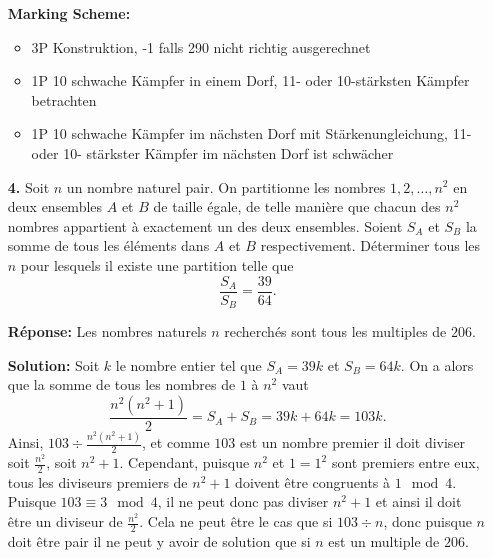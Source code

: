 \documentclass[language=german,style=solution]{smo}
\begin{document}
\begin{enumerate}
\textbf{Marking Scheme:}
\begin{itemize}
	\item 3P Konstruktion, -1 falls 290 nicht richtig ausgerechnet
	\item 1P 10 schwache Kämpfer in einem Dorf, 11- oder 10-stärksten Kämpfer betrachten
	\item 1P 10 schwache Kämpfer im nächsten Dorf mit Stärkenungleichung, 11- oder 10- stärkster Kämpfer im nächsten Dorf ist schwächer
\end{itemize}


\newpage

\item[\textbf{4.}] %
Soit $n$ un nombre naturel pair. On partitionne les nombres $1, 2, \ldots, n^2$ en deux ensembles $A$ et $B$ de taille égale, de telle manière que chacun des $n^2$ nombres appartient à exactement un des deux ensembles. Soient $S_A$ et $S_B$ la somme de tous les éléments dans $A$ et $B$ respectivement. Déterminer tous les $n$ pour lesquels il existe une partition telle que
\[
\frac{S_A}{S_B} = \frac{39}{64}.
\]

\textbf{Réponse:}
Les nombres naturels $n$ recherchés sont tous les multiples de $206$.

\textbf{Solution:}
Soit $k$ le nombre entier tel que $S_A = 39k$ et $S_B = 64k$. On a alors que la somme de tous les nombres de $1$ à $n^2$ vaut
\[
	\frac{n^2(n^2+1)}{2} = S_A + S_B = 39k + 64k = 103k.
\]
Ainsi, $103 \div \frac{n^2(n^2+1)}{2}$, et comme $103$ est un nombre premier il doit diviser soit $\frac{n^2}{2}$, soit $n^2+1$. Cependant, puisque $n^2$ et $1 = 1^2$ sont premiers entre eux, tous les diviseurs premiers de $n^2+1$ doivent être congruents à $1 \mod 4$. Puisque $103 \equiv 3\mod 4$, il ne peut donc pas diviser $n^2+1$ et ainsi il doit être un diviseur de $\frac{n^2}{2}$. Cela ne peut être le cas que si $103 \div n$, donc puisque $n$ doit être pair il ne peut y avoir de solution que si $n$ est un multiple de $206$.


\end{enumerate}
\end{document}
